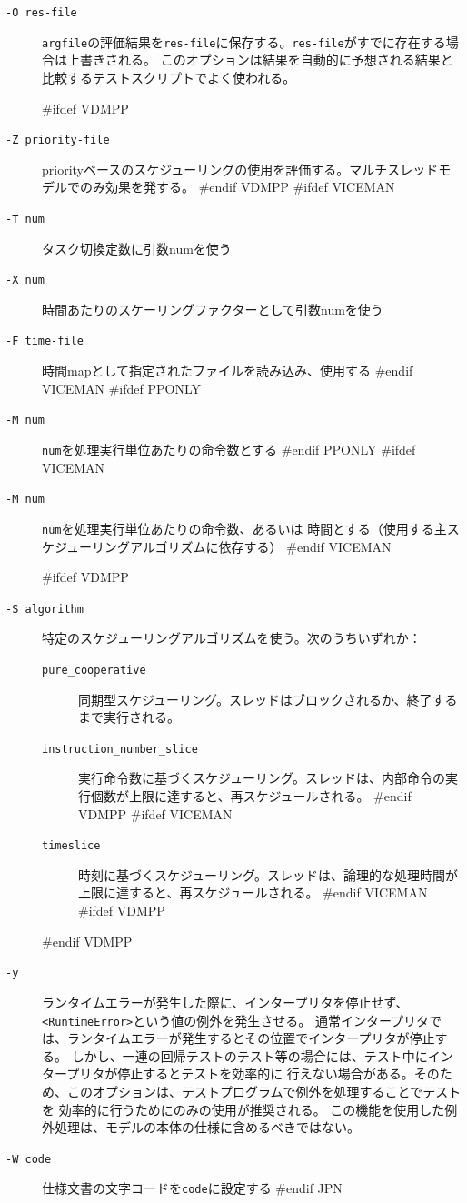 \documentclass[\pformat,12pt]{article}
\begin{document}
\begin{description}
\item[{\tt -O res-file}]
  {\tt argfile}の評価結果を{\tt res-file}に保存する。{\tt res-file}がすでに存在する場合は上書きされる。
  このオプションは結果を自動的に予想される結果と比較するテストスクリプトでよく使われる。
  
#ifdef VDMPP
\item[{\tt -Z priority-file}]
  priorityベースのスケジューリングの使用を評価する。マルチスレッドモデルでのみ効果を発する。
#endif VDMPP
#ifdef VICEMAN
\item[{\tt -T num}] タスク切換定数に引数numを使う
\item[{\tt -X num}] 時間あたりのスケーリングファクターとして引数numを使う
\item[{\tt -F time-file}] 時間mapとして指定されたファイルを読み込み、使用する
#endif VICEMAN
#ifdef PPONLY
\item[{\tt -M num}] {\tt num}を処理実行単位あたりの命令数とする
#endif PPONLY
#ifdef VICEMAN
\item[{\tt -M num}] {\tt num}を処理実行単位あたりの命令数、あるいは
時間とする（使用する主スケジューリングアルゴリズムに依存する）
#endif VICEMAN

#ifdef VDMPP
\item[{\tt -S algorithm}]
  特定のスケジューリングアルゴリズムを使う。次のうちいずれか：
  \begin{description}
  \item[{\tt pure\_cooperative}] 同期型スケジューリング。スレッドはブロックされるか、終了するまで実行される。
  \item[{\tt instruction\_number\_slice}] 実行命令数に基づくスケジューリング。スレッドは、内部命令の実行個数が上限に達すると、再スケジュールされる。
#endif VDMPP
#ifdef VICEMAN
  \item[{\tt timeslice}] 時刻に基づくスケジューリング。スレッドは、論理的な処理時間が上限に達すると、再スケジュールされる。
#endif VICEMAN
#ifdef VDMPP
  \end{description}
#endif VDMPP

\item[{\tt -y}]
  ランタイムエラーが発生した際に、インタープリタを停止せず、{\tt<RuntimeError>}という値の例外を発生させる。
  通常インタープリタでは、ランタイムエラーが発生するとその位置でインタープリタが停止する。
しかし、一連の回帰テストのテスト等の場合には、テスト中にインタープリタが停止するとテストを効率的に
行えない場合がある。そのため、このオプションは、テストプログラムで例外を処理することでテストを
効率的に行うためにのみの使用が推奨される。
この機能を使用した例外処理は、モデルの本体の仕様に含めるべきではない。

\item[{\tt -W code}] 仕様文書の文字コードを{\tt code}に設定する
#endif JPN

\end{description}
\end{document}
